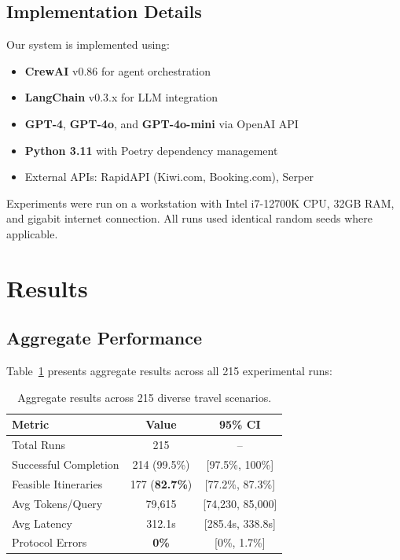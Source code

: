 \documentclass[preprint,review,12pt]{elsarticle}
\begin{document}
\subsection{Implementation Details}

Our system is implemented using:

\begin{itemize}
    \item \textbf{CrewAI} v0.86 for agent orchestration
    \item \textbf{LangChain} v0.3.x for LLM integration
    \item \textbf{GPT-4}, \textbf{GPT-4o}, and \textbf{GPT-4o-mini} via OpenAI API
    \item \textbf{Python 3.11} with Poetry dependency management
    \item External APIs: RapidAPI (Kiwi.com, Booking.com), Serper
\end{itemize}

Experiments were run on a workstation with Intel i7-12700K CPU, 32GB RAM, and gigabit internet connection. All runs used identical random seeds where applicable.

\section{Results}
\label{sec:results}

\subsection{Aggregate Performance}

Table~\ref{tab:results} presents aggregate results across all 215 experimental runs:

\begin{table}[h]
\centering
\caption{Aggregate results across 215 diverse travel scenarios.}
\label{tab:results}
\begin{tabular}{lcc}
\toprule
\textbf{Metric} & \textbf{Value} & \textbf{95\% CI} \\
\midrule
Total Runs & 215 & -- \\
Successful Completion & 214 (99.5\%) & [97.5\%, 100\%] \\
Feasible Itineraries & 177 (\textbf{82.7\%}) & [77.2\%, 87.3\%] \\
Avg Tokens/Query & 79,615 & [74,230, 85,000] \\
Avg Latency & 312.1s & [285.4s, 338.8s] \\
Protocol Errors & \textbf{0\%} & [0\%, 1.7\%] \\
\bottomrule
\end{tabular}
\end{table}
\end{document}
